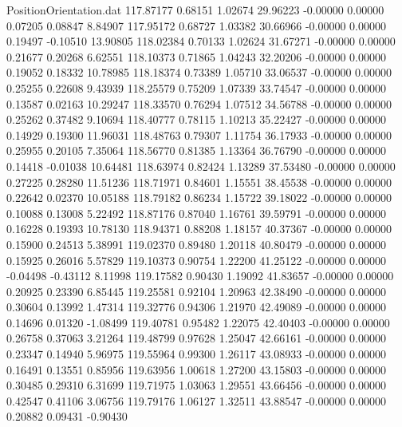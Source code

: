\begin{filecontents}{PositionOrientation.dat}
 117.87177    0.68151    1.02674    29.96223   -0.00000    0.00000    0.07205    0.08847    8.84907
 117.95172    0.68727    1.03382    30.66966   -0.00000    0.00000    0.19497   -0.10510   13.90805
 118.02384    0.70133    1.02624    31.67271   -0.00000    0.00000    0.21677    0.20268    6.62551
 118.10373    0.71865    1.04243    32.20206   -0.00000    0.00000    0.19052    0.18332   10.78985
 118.18374    0.73389    1.05710    33.06537   -0.00000    0.00000    0.25255    0.22608    9.43939
 118.25579    0.75209    1.07339    33.74547   -0.00000    0.00000    0.13587    0.02163   10.29247
 118.33570    0.76294    1.07512    34.56788   -0.00000    0.00000    0.25262    0.37482    9.10694
 118.40777    0.78115    1.10213    35.22427   -0.00000    0.00000    0.14929    0.19300   11.96031
 118.48763    0.79307    1.11754    36.17933   -0.00000    0.00000    0.25955    0.20105    7.35064
 118.56770    0.81385    1.13364    36.76790   -0.00000    0.00000    0.14418   -0.01038   10.64481
 118.63974    0.82424    1.13289    37.53480   -0.00000    0.00000    0.27225    0.28280   11.51236
 118.71971    0.84601    1.15551    38.45538   -0.00000    0.00000    0.22642    0.02370   10.05188
 118.79182    0.86234    1.15722    39.18022   -0.00000    0.00000    0.10088    0.13008    5.22492
 118.87176    0.87040    1.16761    39.59791   -0.00000    0.00000    0.16228    0.19393   10.78130
 118.94371    0.88208    1.18157    40.37367   -0.00000    0.00000    0.15900    0.24513    5.38991
 119.02370    0.89480    1.20118    40.80479   -0.00000    0.00000    0.15925    0.26016    5.57829
 119.10373    0.90754    1.22200    41.25122   -0.00000    0.00000   -0.04498   -0.43112    8.11998
 119.17582    0.90430    1.19092    41.83657   -0.00000    0.00000    0.20925    0.23390    6.85445
 119.25581    0.92104    1.20963    42.38490   -0.00000    0.00000    0.30604    0.13992    1.47314
 119.32776    0.94306    1.21970    42.49089   -0.00000    0.00000    0.14696    0.01320   -1.08499
 119.40781    0.95482    1.22075    42.40403   -0.00000    0.00000    0.26758    0.37063    3.21264
 119.48799    0.97628    1.25047    42.66161   -0.00000    0.00000    0.23347    0.14940    5.96975
 119.55964    0.99300    1.26117    43.08933   -0.00000    0.00000    0.16491    0.13551    0.85956
 119.63956    1.00618    1.27200    43.15803   -0.00000    0.00000    0.30485    0.29310    6.31699
 119.71975    1.03063    1.29551    43.66456   -0.00000    0.00000    0.42547    0.41106    3.06756
 119.79176    1.06127    1.32511    43.88547   -0.00000    0.00000    0.20882    0.09431   -0.90430

\end{filecontents}
